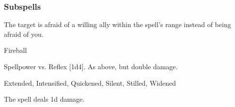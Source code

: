 \subsubsection{Subspells}
The target is afraid of a willing ally within the spell's range instead of being afraid of you.
\begin{spellsection}{Fireball}
\begin{spellheader}
\end{spellheader}
\begin{spellcontent}
\begin{spelltargetinginfo}
\end{spelltargetinginfo}
\begin{spelleffects}
\begin{spellattack}{Spellpower vs. Reflex}
\spellsuccess {}[1d4].
\spellcritical As above, but double damage.
\end{spellattack}
\end{spelleffects}
\end{spellcontent}
\begin{spellfooter}
 Extended, Intensified, Quickened, Silent, Stilled, Widened
\end{spellfooter}
\begin{spellsubcontent}
\begin{spellcantrip}
The spell deals \minus1d damage.
\end{spellcantrip}
\end{spellsubcontent}
\end{spellsection}
